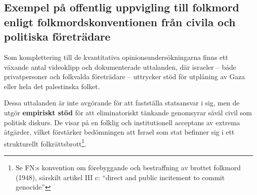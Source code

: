 \subsection{Exempel på offentlig uppvigling till folkmord enligt folkmordskonventionen från civila och politiska företrädare}

Som komplettering till de kvantitativa opinionsundersökningarna finns ett växande antal videoklipp och dokumenterade uttalanden, där israeler – både privatpersoner och folkvalda företrädare – uttrycker stöd för utplåning av Gaza eller hela det palestinska folket.

Dessa uttalanden är inte avgörande för att fastställa statsansvar i sig, men de utgör \textbf{empiriskt stöd} för att eliminatoriskt tänkande genomsyrar såväl civil som politisk diskurs. De visar på en folklig och institutionell acceptans av extrema åtgärder, vilket förstärker bedömningen att Israel som stat befinner sig i ett strukturellt folkrättsbrott\footnote{Se FN:s konvention om förebyggande och bestraffning av brottet folkmord (1948), särskilt artikel III c: “direct and public incitement to commit genocide”}.

